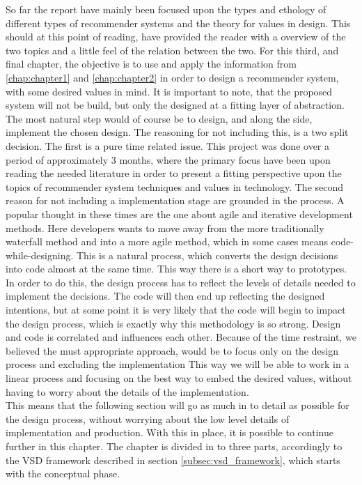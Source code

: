 So far the report have mainly been focused upon the types and ethology of different types of recommender systems and the theory for values in design. This should at this point of reading, have provided the reader with a overview of the two topics and a little feel of the relation between the two. For this third, and final chapter, the objective is to use and apply the information from \ref{chap:chapter1} and \ref{chap:chapter2} in order to design a recommender system, with some desired values in mind. It is important to note, that the proposed system will not be build, but only the designed at a fitting layer of abstraction. The most natural step would of course be to design, and along the side, implement the chosen design. The reasoning for not including this, is a two split decision. The first is a pure time related issue. This project was done over a period of approximately 3 months, where the primary focus have been upon reading the needed literature in order to present a fitting perspective upon the topics of recommender system techniques and values in technology. The second reason for not including a implementation stage are grounded in the process. A popular thought in these times are the one about agile and iterative development methods. Here developers wants to move away from the more traditionally waterfall method and into a more agile method, which in some cases means code-while-designing. This is a natural process, which converts the design decisions into code almost at the same time. This way there is a short way to prototypes. In order to do this, the design process has to reflect the levels of details needed to implement the decisions. The code will then end up reflecting the designed intentions, but at some point it is very likely that the code will begin to impact the design process, which is exactly why this methodology is so strong. Design and code is correlated and influences each other. Because of the time restraint, we believed the must appropriate approach, would be to focus only on the design process and excluding the implementation This way we will be able to work in a linear process and focusing on the best way to embed the desired values, without having to worry about the details of the implementation.\\
This means that the following section will go as much in to detail as possible for the design process, without worrying about the low level details of implementation and production. 
With this in place, it is possible to continue further in this chapter. The chapter is divided in to three parts, accordingly to the VSD framework described in section \ref{subsec:vsd_framework}, which starts with the conceptual phase.


